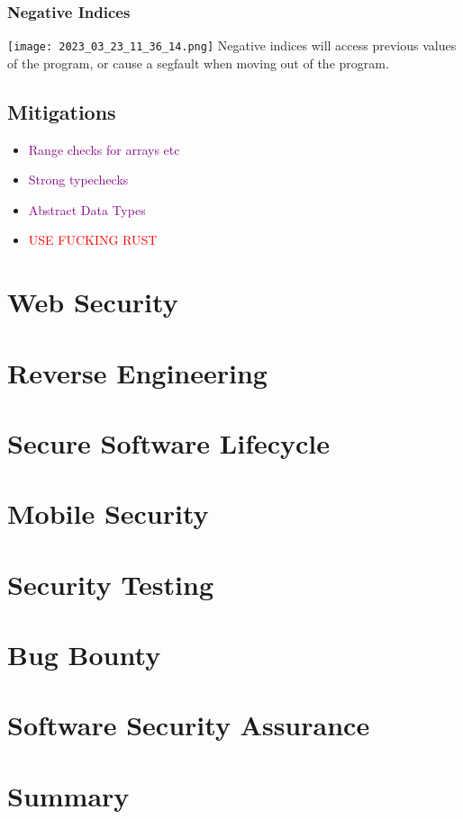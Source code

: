 \documentclass[main.tex,fontsize=8pt,paper=a4,paper=portrait,DIV=calc,]{scrartcl}
\begin{document}
\subsubsection{Negative Indices}
\texttt{[image: 2023\_03\_23\_11\_36\_14.png]}\newline
Negative indices will access previous values of the program, or cause a segfault when moving out of the program.

\subsection{Mitigations}
\begin{itemize}
\item \textcolor{purple}{Range checks for arrays etc}
\item \textcolor{purple}{Strong typechecks}
\item \textcolor{purple}{Abstract Data Types}
\item \textcolor{red}{USE FUCKING RUST}
\end{itemize} 

\section{Web Security}

\section{Reverse Engineering}

\section{Secure Software Lifecycle}

\section{Mobile Security}

\section{Security Testing}

\section{Bug Bounty}

\section{Software Security Assurance}

\section{Summary}
\end{document}
